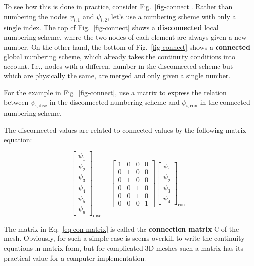 To see how this is done in practice, consider Fig.~\ref{fig-connect}. Rather than numbering the nodes $\psi_{l,1}$ and $\psi_{l,2}$, let's use a numbering scheme with only a single index. The top of Fig.~\ref{fig-connect} shows a \textbf{disconnected} local numbering scheme, where the two nodes of each element are always given a new number. On the other hand, the bottom of Fig.~\ref{fig-connect} shows a \textbf{connected} global numbering scheme, which already takes the continuity conditions into account. I.e., nodes with a different number in the disconnected scheme but which are physically the same, are merged and only given a single number.

\begin{cue}
For the example in Fig.~\ref{fig-connect}, use a matrix to express the relation between $\psi_{i, \mathrm{disc}}$ in the disconnected numbering scheme and  $\psi_{i, \mathrm{con}}$ in the connected numbering scheme.
\end{cue}
  
The disconnected values are related to connected values by the following matrix equation:

\begin{equation}
\begin{bmatrix}
\psi_1 \\ \psi_2 \\ \psi_3 \\ \psi_4 \\ \psi_5 \\ \psi_6
\end{bmatrix}_{\mathrm{disc}}
=
\begin{bmatrix}
1 & 0 & 0 & 0  \\ 
0 & 1 & 0 & 0  \\   
0 & 1 & 0 & 0  \\ 
0 & 0 & 1 & 0  \\   
0 & 0 & 1 & 0  \\  
0 & 0 & 0 & 1  
\end{bmatrix}
\begin{bmatrix}
\psi_1 \\ \psi_2 \\ \psi_3 \\ \psi_4
\end{bmatrix}_{\mathrm{con}}
\label{eq-con-matrix}
\end{equation} 

The matrix in Eq.~\ref{eq-con-matrix} is called the \textbf{connection matrix} {\mathbf C} of the mesh. Obviously, for such a simple case is seems overkill to write the continuity equations in matrix form, but for complicated 3D meshes such a matrix has its practical value for a computer implementation.

